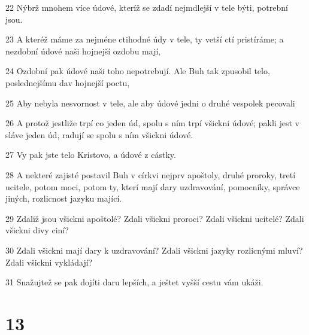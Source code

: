 \par 22 Nýbrž mnohem více údové, kteríž se zdadí nejmdlejší v tele býti, potrební jsou.
\par 23 A kteréž máme za nejméne ctihodné údy v tele, ty vetší ctí pristíráme; a nezdobní údové naši hojnejší ozdobu mají,
\par 24 Ozdobní pak údové naši toho nepotrebují. Ale Buh tak zpusobil telo, poslednejšímu dav hojnejší poctu,
\par 25 Aby nebyla nesvornost v tele, ale aby údové jedni o druhé vespolek pecovali
\par 26 A protož jestliže trpí co jeden úd, spolu s ním trpí všickni údové; pakli jest v sláve jeden úd, radují se spolu s ním všickni údové.
\par 27 Vy pak jste telo Kristovo, a údové z cástky.
\par 28 A nekteré zajisté postavil Buh v církvi nejprv apoštoly, druhé proroky, tretí ucitele, potom moci, potom ty, kterí mají dary uzdravování, pomocníky, správce jiných, rozlicnost jazyku mající.
\par 29 Zdaliž jsou všickni apoštolé? Zdali všickni proroci? Zdali všickni ucitelé? Zdali všickni divy ciní?
\par 30 Zdali všickni mají dary k uzdravování? Zdali všickni jazyky rozlicnými mluví? Zdali všickni vykládají?
\par 31 Snažujtež se pak dojíti daru lepších, a ještet vyšší cestu vám ukáži.

\chapter{13}

